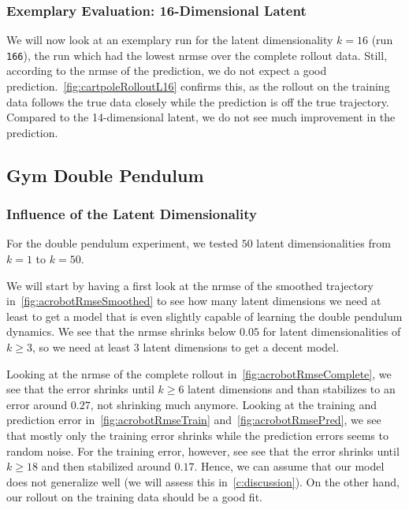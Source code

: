 		\subsubsection{Exemplary Evaluation: 16-Dimensional Latent}
			\label{subsubsec:cartpoleL16}

			We will now look at an exemplary run for the latent dimensionality \( k = 16 \) (run \texttt{166}), the run which had the lowest \ac{nrmse} over the complete rollout data. Still, according to the \ac{nrmse} of the prediction, we do not expect a good prediction.~\autoref{fig:cartpoleRolloutL16} confirms this, as the rollout on the training data follows the true data closely while the prediction is off the true trajectory. Compared to the 14-dimensional latent, we do not see much improvement in the prediction.

	\subsection{Gym Double Pendulum} %

		\subsubsection{Influence of the Latent Dimensionality}
			For the double pendulum experiment, we tested \(50\) latent dimensionalities from \( k = 1 \) to \( k = 50 \).

			We will start by having a first look at the \ac{nrmse} of the smoothed trajectory in~\autoref{fig:acrobotRmseSmoothed} to see how many latent dimensions we need at least to get a model that is even slightly capable of learning the double pendulum dynamics. We see that the \ac{nrmse} shrinks below \(0.05\) for latent dimensionalities of \( k \geq 3 \), so we need at least \(3\) latent dimensions to get a decent model.

			Looking at the \ac{nrmse} of the complete rollout in~\autoref{fig:acrobotRmseComplete}, we see that the error shrinks until \( k \geq 6 \) latent dimensions and than stabilizes to an error around \( 0.27 \), not shrinking much anymore. Looking at the training and prediction error in~\autoref{fig:acrobotRmseTrain} and~\autoref{fig:acrobotRmsePred}, we see that mostly only the training error shrinks while the prediction errors seems to random noise. For the training error, however, see see that the error shrinks until \( k \geq 18 \) and then stabilized around \( 0.17 \). Hence, we can assume that our model does not generalize well (we will assess this in~\autoref{c:discussion}). On the other hand, our rollout on the training data should be a good fit.

